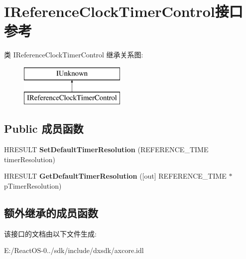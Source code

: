 \hypertarget{interface_i_reference_clock_timer_control}{}\section{I\+Reference\+Clock\+Timer\+Control接口 参考}
\label{interface_i_reference_clock_timer_control}
类 I\+Reference\+Clock\+Timer\+Control 继承关系图\+:\begin{figure}[H]
\begin{center}
\leavevmode
\includegraphics[height=2.000000cm]{interface_i_reference_clock_timer_control}
\end{center}
\end{figure}
\subsection*{Public 成员函数}
\begin{DoxyCompactItemize}
\item 
\mbox{\label{interface_i_reference_clock_timer_control_a3164637fd2e8589936f8feac9cec6685}} 
H\+R\+E\+S\+U\+LT {\bfseries Set\+Default\+Timer\+Resolution} (R\+E\+F\+E\+R\+E\+N\+C\+E\+\_\+\+T\+I\+ME timer\+Resolution)
\item 
\mbox{\label{interface_i_reference_clock_timer_control_a75eb17dd9e148ffa9028577e0ff1c205}} 
H\+R\+E\+S\+U\+LT {\bfseries Get\+Default\+Timer\+Resolution} (\mbox{[}out\mbox{]} R\+E\+F\+E\+R\+E\+N\+C\+E\+\_\+\+T\+I\+ME $\ast$p\+Timer\+Resolution)
\end{DoxyCompactItemize}
\subsection*{额外继承的成员函数}


该接口的文档由以下文件生成\+:\begin{DoxyCompactItemize}
\item 
E\+:/\+React\+O\+S-\/0../sdk/include/dxsdk/axcore.\+idl\end{DoxyCompactItemize}
